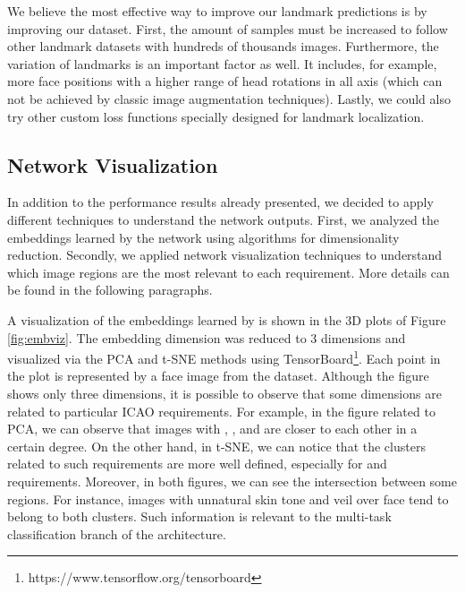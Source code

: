 We believe the most effective way to improve our landmark predictions is by improving our dataset. First, the amount of samples must be increased to follow other landmark datasets with hundreds of thousands images. Furthermore, the variation of landmarks is an important factor as well. It includes, for example, more face positions with a higher range of head rotations in all axis (which can not be achieved by classic image augmentation techniques). Lastly, we could also try other custom loss functions specially designed for landmark localization.



\subsection{Network Visualization} \label{sec:netviz}

In addition to the performance results already presented, we decided to apply different techniques to understand the network outputs. First, we analyzed the embeddings learned by the network using algorithms for dimensionality reduction. Secondly, we applied network visualization techniques to understand which image regions are the most relevant to each requirement. More details can be found in the following paragraphs.

A visualization of the embeddings learned by \methodname is shown in the 3D plots of Figure \ref{fig:embviz}. The embedding dimension was reduced to 3 dimensions and visualized via the PCA and t-SNE methods using TensorBoard\footnote{https://www.tensorflow.org/tensorboard}. Each point in the plot is represented by a face image from the dataset. Although the figure shows only three dimensions, it is possible to observe that some dimensions are related to particular ICAO requirements. For example, in the figure related to PCA, we can observe that images with \variedbackground, \unnaturalskintone, and \veiloverface are closer to each other in a certain degree. On the other hand, in t-SNE, we can notice that the clusters related to such requirements are more well defined, especially for \variedbackground and \veiloverface requirements. Moreover, in both figures, we can see the intersection between some regions. For instance, images with unnatural skin tone and veil over face tend to belong to both clusters. Such information is relevant to the multi-task classification branch of the \methodname architecture. 

